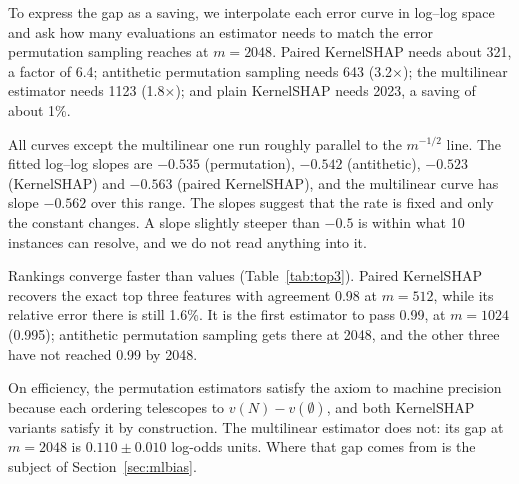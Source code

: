 \documentclass[conference]{IEEEtran}
\begin{document}
To express the gap as a saving, we interpolate each error curve in log--log space and ask how many evaluations an estimator needs to match the error permutation sampling reaches at $m=2048$. Paired KernelSHAP needs about 321, a factor of 6.4; antithetic permutation sampling needs 643 (3.2$\times$); the multilinear estimator needs 1123 (1.8$\times$); and plain KernelSHAP needs 2023, a saving of about 1\%.

All curves except the multilinear one run roughly parallel to the $m^{-1/2}$ line. The fitted log--log slopes are $-0.535$ (permutation), $-0.542$ (antithetic), $-0.523$ (KernelSHAP) and $-0.563$ (paired KernelSHAP), and the multilinear curve has slope $-0.562$ over this range. The slopes suggest that the rate is fixed and only the constant changes. A slope slightly steeper than $-0.5$ is within what 10 instances can resolve, and we do not read anything into it.

\begin{table}[t]
\caption{Top-3 agreement with the exact ranking, $d=12$ (mean over 10 instances; standard errors range from 0 to 0.03).}
\label{tab:top3}
\centering
\small
{}
\end{table}

Rankings converge faster than values (Table~\ref{tab:top3}). Paired KernelSHAP recovers the exact top three features with agreement 0.98 at $m=512$, while its relative error there is still 1.6\%. It is the first estimator to pass 0.99, at $m=1024$ (0.995); antithetic permutation sampling gets there at 2048, and the other three have not reached 0.99 by 2048.

On efficiency, the permutation estimators satisfy the axiom to machine precision because each ordering telescopes to $v(N)-v(\emptyset)$, and both KernelSHAP variants satisfy it by construction. The multilinear estimator does not: its gap at $m=2048$ is $0.110\pm0.010$ log-odds units. Where that gap comes from is the subject of Section~\ref{sec:mlbias}.
\end{document}
